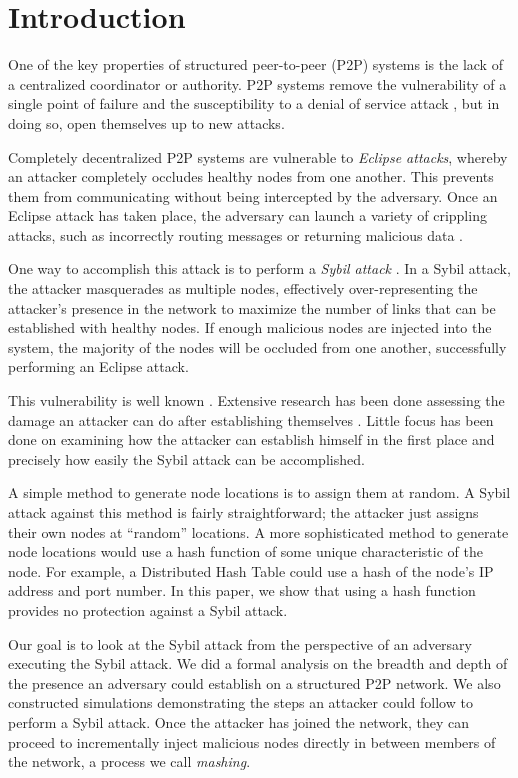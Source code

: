 \documentclass[11pt,conference]{IEEEtran}
\begin{document}
\section{Introduction}
One of the key properties of structured peer-to-peer (P2P) systems is the lack of a centralized coordinator or authority.
P2P systems remove the vulnerability of a single point of failure and the susceptibility to a denial of service attack \cite{sybil}, but in doing so, open themselves up to new attacks.

Completely decentralized P2P systems are vulnerable to \textit{Eclipse attacks}, whereby an attacker completely occludes healthy nodes from one another.
This prevents them from communicating without being intercepted by the adversary.
Once an Eclipse attack has taken place, the adversary can launch a variety of crippling attacks, such as incorrectly routing messages or returning malicious data \cite{srivatsa2004vulnerabilities}.

One way to accomplish this attack is to perform a \emph{Sybil attack} \cite{sybil}.
In a Sybil attack, the attacker masquerades as multiple nodes, effectively over-representing the attacker's presence in the network to maximize the number of links that can be established with healthy nodes.
If enough malicious nodes are injected into the system, the majority of the nodes will be occluded from one another, successfully performing an Eclipse attack.

This vulnerability is well known \cite{dhtsec}. 
Extensive research has been done assessing the damage an attacker can do after establishing themselves \cite{srivatsa2004vulnerabilities}.
Little focus has been done on examining how the attacker can establish himself in the first place and precisely how easily the Sybil attack can be accomplished.


A simple method to generate node locations is to assign them at random.
A Sybil attack against this method is fairly straightforward; the attacker just assigns their own nodes at ``random'' locations.
A more sophisticated method to generate node locations would use a hash function of some unique characteristic of the node.
For example, a Distributed Hash Table could use a hash of the node's IP address and port number.
In this paper, we show that using a hash function provides no protection against a Sybil attack.

Our goal is to look at the Sybil attack from the perspective of an adversary executing the Sybil attack.
We did a formal analysis on the breadth and depth of the presence an adversary could establish on a structured P2P network.
We also constructed simulations demonstrating the steps an attacker could follow to perform a Sybil attack.
Once the attacker has joined the network, they can proceed to incrementally inject malicious nodes directly in between members of the network, a process we call \textit{mashing}.
\end{document}
